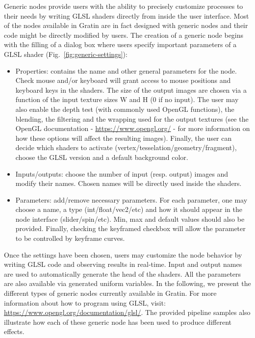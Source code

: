 \noindent Generic nodes provide users with the ability to precisely customize
processes to their needs by writing GLSL shaders directly from inside
the user interface. Most of the nodes available in Gratin are in fact
designed with generic nodes and their code might be directly modified
by users.  The creation of a generic node begins with the filling of a
dialog box where users specify important parameters of a GLSL shader
(Fig.~\ref{fig:generic-settings}):
\begin{itemize}
 \setlength\itemsep{0cm}
\item Properties: contains the name and other general parameters for
  the node. Check mouse and/or keyboard will grant access to mouse
  positions and keyboard keys in the shaders. The size of the output
  images are chosen via a function of the input texture sizes W and H
  (0 if no input). The user may also enable the depth test (with
  commonly used OpenGL functions), the blending, the filtering and the
  wrapping used for the output textures (see the OpenGL documentation
  - \url{https://www.opengl.org/} - for more information on how these
  options will affect the resulting images). Finally, the user can
  decide which shaders to activate
  (vertex/tesselation/geometry/fragment), choose the GLSL version and
  a default background color.
\item Inputs/outputs: choose the number of input
  (resp. output) images and modify their names. Chosen names will be
  directly used inside the shaders.
\item Parameters: add/remove necessary parameters. For each
  parameter, one may choose a name, a type (int/float/vec2/etc) and
  how it should appear in the node interface (slider/spin/etc). Min,
  max and default values should also be provided. Finally, checking
  the keyframed checkbox will allow the parameter to be controlled by
  keyframe curves.
\end{itemize}
%
Once the settings have been chosen, users may customize the node behavior
by writing GLSL code and observing results in real-time. Input and
output names are used to automatically generate the head of the
shaders. All the parameters are also available via generated uniform
variables. In the following, we present the different types of generic
nodes currently available in Gratin. For more information about how to
program using GLSL, visit:
\url{https://www.opengl.org/documentation/glsl/}. The provided
pipeline samples also illustrate how each of these generic node has
been used to produce different effects.

